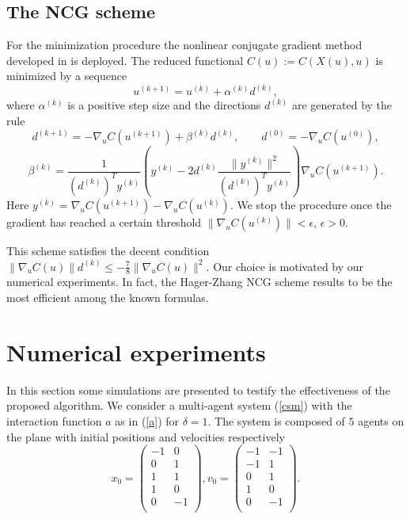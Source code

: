 \documentclass[a4paper,10pt, english]{article}
\begin{document}
 \subsection{The NCG scheme}
  For the minimization procedure the nonlinear conjugate gradient  method developed in \cite{hagerzhang} is deployed.
  The reduced functional $C(u):=C(X(u), u)$ is minimized by a sequence
  \begin{equation}
  u^{(k+1)} =   u^{(k)} + \alpha^{(k)} d^{(k)},
  \label{ncgscheme}
   \end{equation}  
  where $\alpha^{(k)}$ is a positive step size and the directions $d^{(k)}$ are generated by the rule
  \begin{equation}
  d^{(k+1)} = - \nabla_u C(u^{(k+1)}) + \beta^{(k)} d^{(k)}, \qquad d^{(0)} = -\nabla_u C(u^{(0)}),
  \label{drct}
  \end{equation}
  \begin{equation}
  \beta^{(k)} = \frac{1}{(d^{(k)})^T y^{(k)}} \left( y^{(k)} - 2d^{(k)}\frac{\|y^{(k)}\|^2}{(d^{(k)})^T y^{(k)}}\right)\nabla_u C(u^{(k+1)}).
  \label{drct}
  \end{equation}  
  Here $y^{(k)} = \nabla_u C(u^{(k+1)}) - \nabla_u C(u^{(k)})$. 
  We stop the procedure once the gradient has reached a certain threshold $\|\nabla_u C(u^{(k)})\| < \epsilon$, $\epsilon > 0$.
   
  This scheme satisfies the decent condition $\|\nabla_u C(u)\|d^{(k)} \leq -\frac{7}{8}\|\nabla_u C(u)\|^2$. Our choice is motivated by our numerical experiments. In fact, the Hager-Zhang NCG scheme results to be the most efficient among the known formulas. 
  
  
 
 
 \newpage
 \section{Numerical experiments}
In this section some simulations are presented to testify the effectiveness of the proposed algorithm. We consider a multi-agent system (\ref{csm}) with the interaction function 
$a$ as in (\ref{a}) for $\delta = 1$. The system is composed of $5$
agents on the plane with initial positions and velocities respectively
\[x_0 =  \left( \begin{array}{cc}
		  -1  &   0\\
           0  &   1\\
           1  &   1\\
           1  &   0\\
           0 &   -1\\
\end{array} \right),
%
v_0 = 
\left( \begin{array}{cc}
	     -1&  -1\\
	     -1&   1\\
	      0&   1\\
	      1&   0\\
	      0&  -1\\
\end{array} \right).
\]
\end{document}
